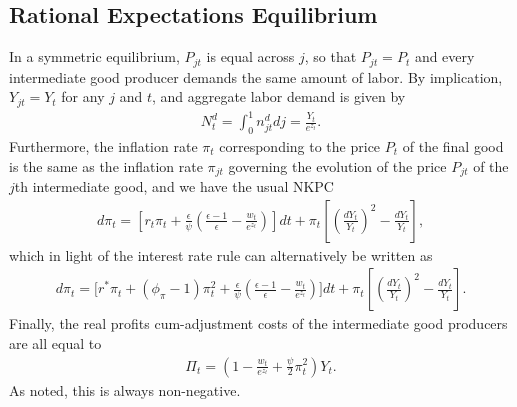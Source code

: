\documentclass[notitlepage,a4paper,11pt]{report}
\numberwithin{section}{chapter}
\numberwithin{subsection}{section}
\begin{document}
\vspace{1cm}


\subsection{Rational Expectations Equilibrium}

In a symmetric equilibrium, $P_{jt}$ is equal across $j$, so that $P_{jt} = P_t$ and every intermediate good producer demands the same amount of labor. By implication, $Y_{jt} = Y_t$ for any $j$ and $t$, and aggregate labor demand is given by 
\begin{align*}
N_t^d = \int_0^1 n_{jt}^d dj = \frac{Y_t}{e^{z_t}}. 
\end{align*}
Furthermore, the inflation rate $\pi_t$ corresponding to the price $P_t$ of the final good is the same as the inflation rate $\pi_{jt}$ governing the evolution of the price $P_{jt}$ of the $j$th intermediate good, and we have the usual NKPC 
\begin{align*}
d\pi_t = \left[ r_t \pi_t + \frac{\epsilon}{\psi} \left( \frac{\epsilon-1}{\epsilon}- \frac{w_t}{e^{z_t} } \right) \right] dt + \pi_t \left[ \left( \frac{dY_t}{Y_t} \right)^2 - \frac{dY_t}{Y_t} \right], 
\end{align*}
which in light of the interest rate rule can alternatively be written as 
\begin{align*}
d \pi_t = \Bigg[ r^* \pi_t + (\phi_{\pi} -1)\pi_t^2 +  \frac{\epsilon}{\psi} \left( \frac{\epsilon-1}{\epsilon} - \frac{w_t}{e^{z_t}} \right) \Bigg] dt + \pi_t \left[ \left( \frac{dY_t}{Y_t} \right)^2 - \frac{dY_t}{Y_t} \right]. 
\end{align*}
Finally, the real profits cum-adjustment costs of the intermediate good producers are all equal to 
\begin{align*}
\Pi_t = \left( 1 - \frac{w_t}{e^{z_t}} + \frac{\psi}{2} \pi_t^2  \right) Y_t. 
\end{align*}
As noted, this is always non-negative. 


\pagebreak
\end{document}
